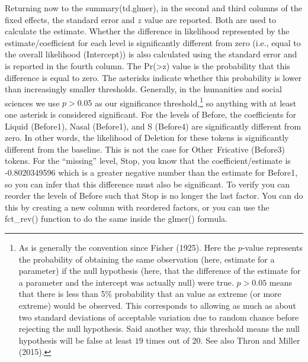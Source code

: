 \documentclass[
  10pt,
  letterpaper]{article}
\renewcommand\texttt[1]{{\ttfamily\color{BrickRed}#1}}
\begin{document}
Returning now to the \texttt{summary(td.glmer)}, in the second and third
columns of the fixed effects, the standard error and \(z\) value are
reported. Both are used to calculate the estimate. Whether the
difference in likelihood represented by the estimate/coefficient for
each level is significantly different from zero (i.e., equal to the
overall likelihood \texttt{(Intercept)}) is also calculated using the
standard error and is reported in the fourth column. The
\texttt{Pr(\textgreater{}\textbar{}z\textbar{})} value is the
probability that this difference is equal to zero. The asterisks
indicate whether this probability is lower than increasingly smaller
thresholds. Generally, in the humanities and social sciences we use
\(p>0.05\) as our significance threshold,\footnote{As is generally the
  convention since Fisher (1925). Here the \(p\)-value represents the
  probability of obtaining the same observation (here, estimate for a
  parameter) if the null hypothesis (here, that the difference of the
  estimate for a parameter and the intercept was actually null) were
  true. \(p>0.05\) means that there is less than 5\% probability that an
  value as extreme (or more extreme) would be observed. This corresponds
  to allowing as much as about two standard deviations of acceptable
  variation due to random chance before rejecting the null hypothesis.
  Said another way, this threshold means the null hypothesis will be
  false at least \(19\) times out of \(20\). See also Thron and Miller
  (2015).} so anything with at least one asterisk is considered
significant. For the levels of \texttt{Before}, the coefficients for
\texttt{Liquid} (\texttt{Before1}), \texttt{Nasal} (\texttt{Before1}),
and \texttt{S} (\texttt{Before4}) are significantly different from zero.
In other words, the likelihood of \texttt{Deletion} for these tokens is
significantly different from the baseline. This is not the case for
\texttt{Other\ Fricative} (\texttt{Before3}) tokens. For the ``missing''
level, \texttt{Stop}, you know that the coefficient/estimate is
\texttt{-0.8020349596} which is a greater negative number than the
estimate for \texttt{Before1}, so you can infer that this difference
must also be significant. To verify you can reorder the levels of
\texttt{Before} such that \texttt{Stop} is no longer the last factor.
You can do this by creating a new column with reordered factors, or you
can use the \texttt{fct\_rev()} function to do the same inside the
\texttt{glmer()} formula.
\end{document}

